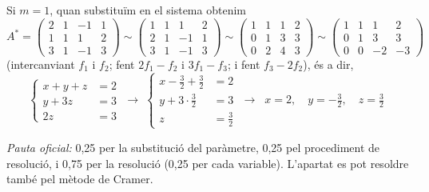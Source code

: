 \begin{apartats}
\begin{solucio}
Si $m=1$, quan substituïm en el sistema obtenim
\[
A^*=\left(\begin{array}{ccc|c}2&1&-1&1\\1&1&1&2\\3&1&-1&3\end{array}\right)
\sim\left(\begin{array}{ccc|c}1&1&1&2\\2&1&-1&1\\3&1&-1&3\end{array}\right)
\sim\left(\begin{array}{ccc|c}1&1&1&2\\0&1&3&3\\0&2&4&3\end{array}\right)
\sim\left(\begin{array}{ccc|c}1&1&1&2\\0&1&3&3\\0&0&-2&-3\end{array}\right)
\]
(intercanviant $f_1$ i $f_2$; fent $2f_1-f_2$ i $3f_1-f_3$; i fent $f_3-2f_2$), és a dir,
\[
\left\{\begin{aligned}x+y+z&=2\\y+3z&=3\\2z&=3\end{aligned}\right.
\;\rightarrow\;
\left\{\begin{aligned}x-\tfrac32+\tfrac32&=2\\y+3\cdot\tfrac32&=3\\z&=\tfrac32\end{aligned}\right.
\;\rightarrow\;
\boxed{\;x=2,\quad y=-\tfrac32,\quad z=\tfrac32\;}
\]

\textit{Pauta oficial:} 0,25 per la substitució del paràmetre, 0,25 pel procediment de resolució, i 0,75 per la
resolució (0,25 per cada variable). L'apartat es pot resoldre també pel mètode de Cramer.
\end{solucio}

\end{apartats}
